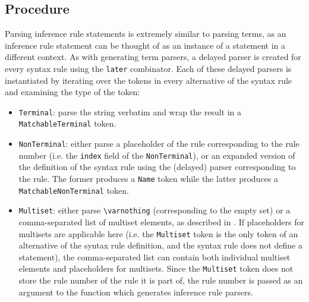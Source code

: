 \subsection{Procedure}
Parsing inference rule statements is extremely similar to parsing terms, as an inference rule statement can be thought of as an instance of a statement in a different context. As with generating term parsers, a delayed parser is created  for every syntax rule using the \lstinline{later} combinator. Each of these delayed parsers is instantiated by iterating over the tokens in every alternative of the syntax rule and examining the type of the token:
\begin{itemize}
    \item \lstinline{Terminal}: parse the string verbatim and wrap the result in a \lstinline{MatchableTerminal} token.
    \item \lstinline{NonTerminal}: either parse a placeholder of the rule corresponding to the rule number (i.e. the \lstinline{index} field of the \lstinline{NonTerminal}), or an expanded version of the definition of the syntax rule using the (delayed) parser corresponding to the rule. The former produces a \lstinline{Name} token while the latter produces a \lstinline{MatchableNonTerminal} token.
    \item \lstinline{Multiset}: either parse \lstinline{\varnothing} (corresponding to the empty set) or a comma-separated list of multiset elements, as described in . If placeholders for multisets are applicable here (i.e. the \lstinline{Multiset} token is the only token of an alternative of the syntax rule definition, and the syntax rule does not define a statement), the comma-separated list can contain both individual multiset elements and placeholders for multisets. Since the \lstinline{Multiset} token does not store the rule number of the rule it is part of, the rule number is passed as an argument to the function which generates inference rule parsers.
\end{itemize}